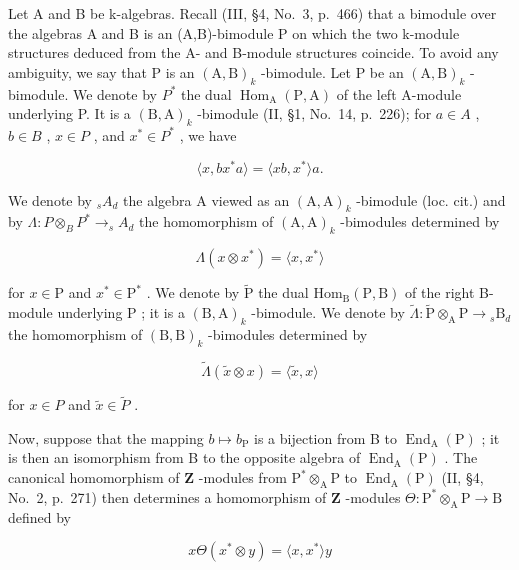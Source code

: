 Let A and B be k-algebras. Recall (III, §4, No.~3, p.~466) that a bimodule over the algebras A and B is an (A,B)-bimodule P on which the two k-module structures deduced from the A- and B-module structures coincide. To avoid any ambiguity, we say that P is an \((\mathrm{A},\mathrm{B})_{k}\) -bimodule. Let P be an \((\mathrm{A},\mathrm{B})_{k}\) -bimodule. We denote by \(P^{*}\) the dual \(\operatorname{Hom}_{\mathrm{A}}(\mathrm{P},\mathrm{A})\) of the left A-module underlying P. It is a \((\mathrm{B},\mathrm{A})_{k}\) -bimodule (II, §1, No.~14, p.~226); for \(a \in A\) , \(b \in B\) , \(x \in P\) , and \(x^{*} \in P^{*}\) , we have

\[
\langle x, b x ^ {*} a \rangle = \langle x b, x ^ {*} \rangle a.\tag{1}
\]

We denote by \(_{s}A_{d}\) the algebra A viewed as an \((\mathrm{A},\mathrm{A})_{k}\) -bimodule (loc. cit.) and by \(\Lambda:P\otimes_{B}P^{*}\to_{s}A_{d}\) the homomorphism of \((\mathrm{A},\mathrm{A})_{k}\) -bimodules determined by

\[
\Lambda (x \otimes x ^ {*}) = \langle x, x ^ {*} \rangle\tag{2}
\]

for \(x \in \mathrm{P}\) and \(x^{*} \in \mathrm{P}^{*}\) . We denote by \(\widetilde{\mathrm{P}}\) the dual \(\mathrm{Hom}_{\mathrm{B}}(\mathrm{P},\mathrm{B})\) of the right B-module underlying \(\mathrm{P}\) ; it is a \((\mathrm{B},\mathrm{A})_{k}\) -bimodule. We denote by \(\widetilde{\Lambda}: \widetilde{\mathrm{P}} \otimes_{\mathrm{A}} \mathrm{P} \to {}_{s}\mathrm{B}_{d}\) the homomorphism of \((\mathrm{B},\mathrm{B})_{k}\) -bimodules determined by

\[
\widetilde {\Lambda} (\widetilde {x} \otimes x) = \langle \widetilde {x}, x \rangle\tag{3}
\]

for \(x \in P\) and \(\widetilde{x} \in \widetilde{P}\) .

Now, suppose that the mapping \(b \mapsto b_{\mathrm{P}}\) is a bijection from B to \(\operatorname{End}_{\mathrm{A}}(\mathrm{P})\) ; it is then an isomorphism from B to the opposite algebra of \(\operatorname{End}_{\mathrm{A}}(\mathrm{P})\) . The canonical homomorphism of \(\mathbf{Z}\) -modules from \(\mathrm{P}^* \otimes_{\mathrm{A}} \mathrm{P}\) to \(\operatorname{End}_{\mathrm{A}}(\mathrm{P})\) (II, §4, No.~2, p.~271) then determines a homomorphism of \(\mathbf{Z}\) -modules \(\Theta: \mathrm{P}^* \otimes_{\mathrm{A}} \mathrm{P} \to \mathrm{B}\) defined by

\[
x \Theta (x ^ {*} \otimes y) = \langle x, x ^ {*} \rangle y\tag{4}
\]

